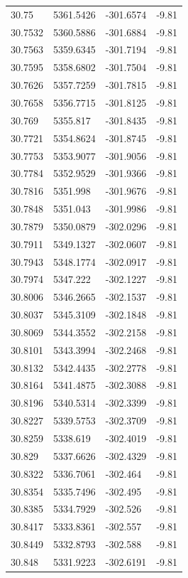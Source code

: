\begin{table}[H]
\begin{tabular}{llll}
30.75 & 5361.5426 & -301.6574 & -9.81 \\
30.7532 & 5360.5886 & -301.6884 & -9.81 \\
30.7563 & 5359.6345 & -301.7194 & -9.81 \\
30.7595 & 5358.6802 & -301.7504 & -9.81 \\
30.7626 & 5357.7259 & -301.7815 & -9.81 \\
30.7658 & 5356.7715 & -301.8125 & -9.81 \\
30.769 & 5355.817 & -301.8435 & -9.81 \\
30.7721 & 5354.8624 & -301.8745 & -9.81 \\
30.7753 & 5353.9077 & -301.9056 & -9.81 \\
30.7784 & 5352.9529 & -301.9366 & -9.81 \\
30.7816 & 5351.998 & -301.9676 & -9.81 \\
30.7848 & 5351.043 & -301.9986 & -9.81 \\
30.7879 & 5350.0879 & -302.0296 & -9.81 \\
30.7911 & 5349.1327 & -302.0607 & -9.81 \\
30.7943 & 5348.1774 & -302.0917 & -9.81 \\
30.7974 & 5347.222 & -302.1227 & -9.81 \\
30.8006 & 5346.2665 & -302.1537 & -9.81 \\
30.8037 & 5345.3109 & -302.1848 & -9.81 \\
30.8069 & 5344.3552 & -302.2158 & -9.81 \\
30.8101 & 5343.3994 & -302.2468 & -9.81 \\
30.8132 & 5342.4435 & -302.2778 & -9.81 \\
30.8164 & 5341.4875 & -302.3088 & -9.81 \\
30.8196 & 5340.5314 & -302.3399 & -9.81 \\
30.8227 & 5339.5753 & -302.3709 & -9.81 \\
30.8259 & 5338.619 & -302.4019 & -9.81 \\
30.829 & 5337.6626 & -302.4329 & -9.81 \\
30.8322 & 5336.7061 & -302.464 & -9.81 \\
30.8354 & 5335.7496 & -302.495 & -9.81 \\
30.8385 & 5334.7929 & -302.526 & -9.81 \\
30.8417 & 5333.8361 & -302.557 & -9.81 \\
30.8449 & 5332.8793 & -302.588 & -9.81 \\
30.848 & 5331.9223 & -302.6191 & -9.81 \\

\end{tabular}
\end{table}
